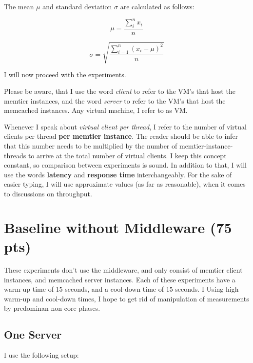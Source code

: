 \documentclass[11pt,a4paper]{article}
\begin{document}
The mean $\mu$ and standard deviation $\sigma$ are calculated as follows:

\begin{equation}
\mu = \frac{\sum_i^n x_i} {n}
\end{equation}

\begin{equation}
\sigma = \sqrt{ \frac{\displaystyle\sum_{i=1}^{n}(x_i - \mu)^2} {n} }
\end{equation}

I will now proceed with the experiments.

Please be aware, that I use the word \textit{client} to refer to the VM's that host the memtier instances, and the word \textit{server} to refer to the VM's that host the memcached instances.
Any virtual machine, I refer to as VM.

Whenever I speak about \textit{virtual client per thread}, I refer to the number of virtual clients per thread \textbf{per memtier instance}.
The reader should be able to infer that this number needs to be multiplied by the number of memtier-instance-threads to arrive at the total number of virtual clients.
I keep this concept constant, so comparison between experiments is sound.
In addition to that, I will use the words \textbf{latency} and \textbf{response time} interchangeably.
For the sake of easier typing, I will use approximate values (as far as reasonable), when it comes to discussions on throughput.

\newpage

\section{Baseline without Middleware (75 pts)}
These experiments don't use the middleware, and only consist of memtier client instances, and memcached server instances.
Each of these experiments have a warm-up time of 15 seconds, and a cool-down time of 15 seconds.
I Using high warm-up and cool-down times, I hope to get rid of manipulation of measurements by predominan non-core phases.

\subsection{One Server}

I use the following setup:
\end{document}
